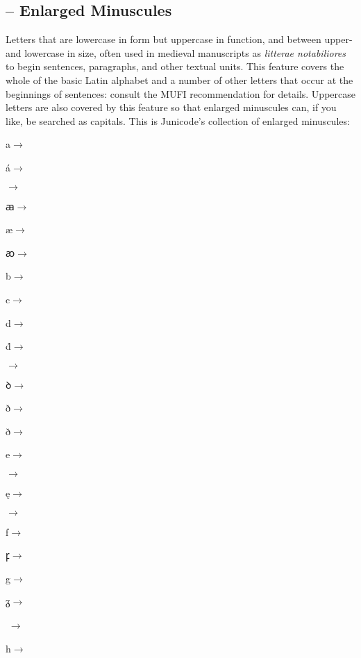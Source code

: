 \subsection{ --
Enlarged Minuscules}\hypertarget{ss06}{}
Letters that are lowercase in form but uppercase in function, and between upper- and
lowercase in size, often used in medieval manuscripts as \textit{litterae notabiliores} to begin sentences,
paragraphs, and other textual units.
This feature
covers the whole of the basic Latin alphabet and a number of other letters that
occur at the beginnings of sentences: consult the MUFI recommendation for details.
Uppercase letters are also covered by this feature so that enlarged minuscules
can, if you like, be searched as capitals. This is Junicode's collection of
enlarged minuscules:

\begin{multicols}{5}
a$\rightarrow $

á$\rightarrow $

$\rightarrow$

ꜳ$\rightarrow $

æ$\rightarrow $

ꜵ$\rightarrow $

b$\rightarrow $

c$\rightarrow $

d$\rightarrow $

ḋ$\rightarrow $

$\rightarrow $

ꝺ$\rightarrow $

{ð$\rightarrow $}

ð$\rightarrow $

e$\rightarrow $

$\rightarrow $

ę$\rightarrow $

$\rightarrow $

f$\rightarrow $

ꝼ$\rightarrow $

g$\rightarrow $

ᵹ$\rightarrow $

ꟑ$\rightarrow $

h$\rightarrow $


\end{multicols}
